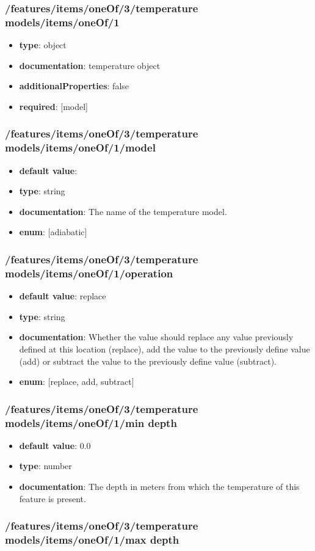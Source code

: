 \subsubsection{/features/items/oneOf/3/temperature models/items/oneOf/1}
\begin{itemize}\item {\bf type}: object
\item {\bf documentation}: temperature object
\item {\bf additionalProperties}: false
\item {\bf required}: [model]\end{itemize}
\subsubsection{/features/items/oneOf/3/temperature models/items/oneOf/1/model}
\begin{itemize}\item {\bf default value}: 
\item {\bf type}: string
\item {\bf documentation}: The name of the temperature model.
\item {\bf enum}: [adiabatic]\end{itemize}\subsubsection{/features/items/oneOf/3/temperature models/items/oneOf/1/operation}
\begin{itemize}\item {\bf default value}: replace
\item {\bf type}: string
\item {\bf documentation}: Whether the value should replace any value previously defined at this location (replace), add the value to the previously define value (add) or subtract the value to the previously define value (subtract).
\item {\bf enum}: [replace, add, subtract]\end{itemize}\subsubsection{/features/items/oneOf/3/temperature models/items/oneOf/1/min depth}
\begin{itemize}\item {\bf default value}: 0.0
\item {\bf type}: number
\item {\bf documentation}: The depth in meters from which the temperature of this feature is present.
\end{itemize}\subsubsection{/features/items/oneOf/3/temperature models/items/oneOf/1/max depth}
